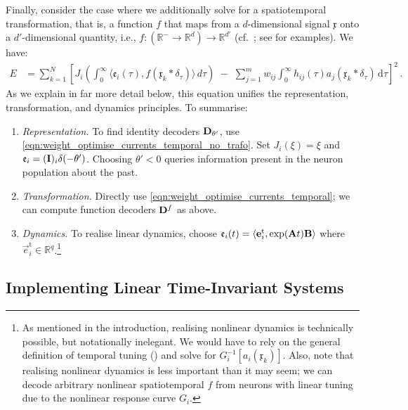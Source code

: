 Finally, consider the case where we additionally solve for a spatiotemporal transformation, that is, a function $f$ that maps from a $d$-dimensional signal $\mathfrak{x}$ onto a $d'$-dimensional quantity, i.e., $f : (\mathbb{R}^- \longrightarrow \mathbb{R}^d) \longrightarrow \mathbb{R}^{d'}$ (cf.~; see  for examples).
We have:
\begin{align}
	E &= \sum_{k = 1}^N \left[
		J_i \left( \! \int_0^\infty \!\!\! \big\langle \mathfrak{e}_i(\tau), f(\mathfrak{x}_k \ast \delta_\tau) \big\rangle \, \mathit{d\tau} \right) \,\,-\,\,
		\sum_{j = 1}^m w_{ij} \! \int_0^\infty \!\!\! h_{ij}(\tau) a_j(\mathfrak{x}_k \ast \delta_\tau) \,\mathrm{d}\tau
	\right]^2 \,.
	\label{eqn:weight_optimise_currents_temporal}
\end{align}
As we explain in far more detail below, this equation unifies the \NEF representation, transformation, and dynamics principles.
To summarise:
\begin{enumerate}[1.]
	\item \emph{Representation.} To find identity decoders $\mathbf{D}_{\theta'}$, use \cref{eqn:weight_optimise_currents_temporal_no_trafo}.
	Set $J_i(\xi) = \xi$ and $\mathfrak{e}_i = (\mathbf{I})_i \delta(-\theta')$.
	Choosing $\theta' < 0$ queries information present in the neuron population about the past.
	\item \emph{Transformation.} Directly use \cref{eqn:weight_optimise_currents_temporal}; we can compute function decoders $\mathbf{D}^f$ as above.
	\item \emph{Dynamics.} To realise linear dynamics, choose $\mathfrak{e}_i(t) = \langle \mathbf{e}^\mathrm{t}_i, \exp(\mathbf{A} t) \mathbf{B} \rangle$ where $\vec e^\mathrm{t}_i \in \mathbb{R}^{q}$.\footnote{As mentioned in the introduction, realising nonlinear dynamics is technically possible, but notationally inelegant. We would have to rely on the general definition of temporal tuning () and solve for $G_i^{-1}[a_i(\mathfrak x_k)]$.
	Also, note that realising nonlinear dynamics is less important than it may seem; we can decode arbitrary nonlinear spatiotemporal $f$ from neurons with linear tuning due to the nonlinear response curve $G_i$.
	}
\end{enumerate}

\pagebreak

\subsection{Implementing Linear Time-Invariant Systems}
\label{sec:temporal_tuning_lti}

